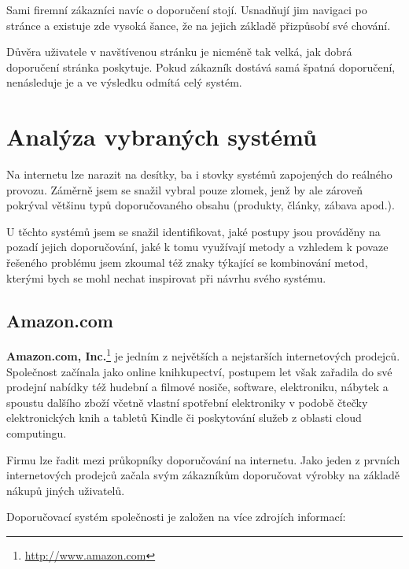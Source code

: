 \documentclass[thesis=M,czech]{FITthesis}[2014/05/07]
\begin{document}
Sami firemní zákazníci navíc o doporučení stojí. Usnadňují jim navigaci po stránce a existuje zde vysoká šance, že na jejich základě přizpůsobí své chování.

Důvěra uživatele v navštívenou stránku je nicméně tak velká, jak dobrá doporučení stránka poskytuje. Pokud zákazník dostává samá špatná doporučení, nenásleduje je a ve výsledku odmítá celý systém.

\section{Analýza vybraných systémů}
\label{sec:examples}
Na internetu lze narazit na desítky, ba i stovky systémů zapojených do reálného provozu. Záměrně jsem se snažil vybral pouze zlomek, jenž by ale zároveň pokrýval většinu typů doporučovaného obsahu (produkty, články, zábava apod.).

U těchto systémů jsem se snažil identifikovat, jaké postupy jsou prováděny na pozadí jejich doporučování, jaké k tomu využívají metody a vzhledem k povaze řešeného problému jsem zkoumal též znaky týkající se kombinování metod, kterými bych se mohl nechat inspirovat při návrhu svého systému.

\subsection{Amazon.com}

\textbf{Amazon.com, Inc.}\footnote{\url{http://www.amazon.com}} je jedním z největších a nejstarších internetových prodejců. Společnost začínala jako online knihkupectví, postupem let však zařadila do své prodejní nabídky též hudební a filmové nosiče, software, elektroniku, nábytek a spoustu dalšího zboží včetně vlastní spotřební elektroniky v podobě čtečky elektronických knih a tabletů Kindle či poskytování služeb z oblasti cloud computingu.

Firmu lze řadit mezi průkopníky doporučování na internetu. Jako jeden z prvních internetových prodejců začala svým zákazníkům doporučovat výrobky na základě nákupů jiných uživatelů.

Doporučovací systém společnosti je založen na více zdrojích informací:
\end{document}
